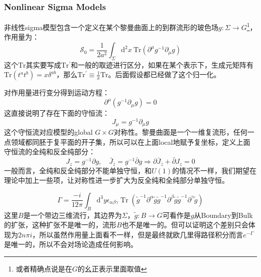 \subsubsection{Nonlinear Sigma Models}
\begin{definition}
	非线性sigma模型包含一个定义在某个黎曼曲面上的到群流形的玻色场$g:\Sigma\to G$\footnote{或者精确点说是在$G$的幺正表示里面取值}，作用量为：
	\begin{equation}
		\mathcal{S}_0=\frac1{2a^2}\int_\Sigma\mathrm{d}^2x\mathrm{~Tr}\left(\partial^\mu g^{-1}\partial_\mu g\right)
	\end{equation}
	这个$\mathrm{Tr}$其实要写成$\mathrm{Tr^\prime}$和一般的取迹进行区分，如果在某个表示下，生成元矩阵有$\mathrm{Tr}(t^a t^b)=x\delta^{ab}$，那么$\mathrm{Tr^\prime}\equiv\frac{1}{x}\mathrm{Tr}$。后面假设都已经做了这个归一化。
\end{definition}
对作用量进行变分得到运动方程：
\begin{equation}
	\partial^\mu(g^{-1}\partial_\mu g)=0
\end{equation}
这直接说明了存在下面的守恒流：
\begin{equation}
	J_\mu=g^{-1}\partial_\mu g
\end{equation}
这个守恒流对应模型的global $G\times G$对称性。黎曼曲面是一个一维复流形，任何一点领域都同胚于复平面的开子集，所以可以在上面local地赋予复坐标，定义上面守恒流的全纯和反全纯部分：
\begin{equation}
	J_z=g^{-1}\partial g,\quad\bar{J}_{\overline{z}}=g^{-1}\overline{\partial}g\Rightarrow\partial\bar{J}_{\overline{z}}+\bar{\partial}J_z=0
\end{equation}
一般而言，全纯和反全纯部分不能单独守恒，和$U(1)$的情况不一样，我们期望在理论中加上一些项，让对称性进一步扩大为反全纯和全纯部分单独守恒。
\begin{definition}
	\begin{equation}
		\Gamma=\frac{-i}{12\pi}\int_B\mathrm{d}^3y\epsilon_{\alpha\beta\gamma}\operatorname{Tr}\left(\widetilde{g}^{-1}\partial^\alpha\widetilde{g}\widetilde{g}^{-1}\partial^\beta\widetilde{g}\widetilde{g}^{-1}\partial^\gamma\widetilde{g}\right)
	\end{equation}
	这里$B$是一个带边三维流行，其边界为$\Sigma$，$\tilde{g}: B\to G$可看作是$g$从Boundary到Bulk的扩张，这种扩张不是唯一的，流形$B$也不是唯一的。但可以证明这个差别只会体现为$2n\pi i$，所以虽然作用量上面看不一样，但是最终就欧几里得路径积分而言$e^{-\Gamma}$是唯一的，所以不会对场论造成任何影响。
\end{definition}
